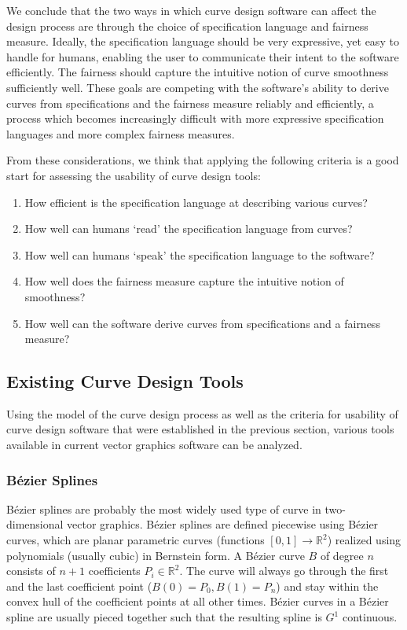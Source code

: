 \documentclass[a4paper]{article}
\newcommand{\apply}[2]{#1\!\left(#2\right)}
\begin{document}
			We conclude that the two ways in which curve design software can affect the design process are through the choice of specification language and fairness measure. Ideally, the specification language should be very expressive, yet easy to handle for humans, enabling the user to communicate their intent to the software efficiently. The fairness should capture the intuitive notion of curve smoothness sufficiently well. These goals are competing with the software's ability to derive curves from specifications and the fairness measure reliably and efficiently, a process which becomes increasingly difficult with more expressive specification languages and more complex fairness measures.

			From these considerations, we think that applying the following criteria is a good start for assessing the usability of curve design tools:
			\begin{enumerate}
				\item How efficient is the specification language at describing various curves?
				\item How well can humans `read' the specification language from curves?
				\item How well can humans `speak' the specification language to the software?
				\item How well does the fairness measure capture the intuitive notion of smoothness?
				\item How well can the software derive curves from specifications and a fairness measure?
			\end{enumerate}

		\subsection{Existing Curve Design Tools}
		\label{section:existing_curve_design_tools}

			Using the model of the curve design process as well as the criteria for usability of curve design software that were established in the previous section, various tools available in current vector graphics software can be analyzed.

			\subsubsection{Bézier Splines}
			\label{section:bézier_splines}

				Bézier splines are probably the most widely used type of curve in two-dimensional vector graphics. Bézier splines are defined piecewise using Bézier curves, which are planar parametric curves (functions \(\left[0,1\right] \rightarrow \mathbb{R}^2\)) realized using polynomials (usually cubic) in Bernstein form. A Bézier curve \(B\) of degree \(n\) consists of \(n + 1\) coefficients \(P_i \in \mathbb{R}^2\). The curve will always go through the first and the last coefficient point (\(\apply{B}{0} = P_0, \apply{B}{1} = P_n\)) and stay within the convex hull of the coefficient points at all other times. Bézier curves in a Bézier spline are usually pieced together such that the resulting spline is \(G^1\) continuous.
\end{document}
